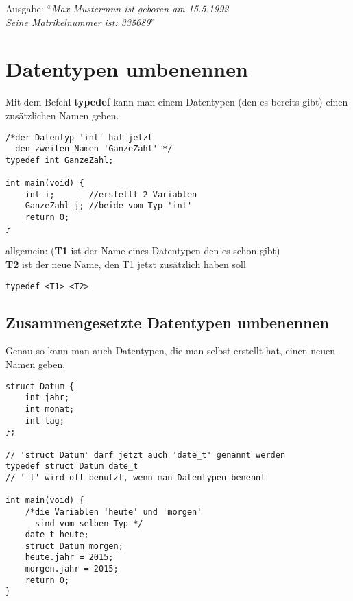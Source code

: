 \documentclass[c_worksheet.tex]{subfiles}
\begin{document}
\begin{tabbing}
Ausgabe: ``\=\textit{Max Mustermnn ist geboren am 15.5.1992}\\
           \>\textit{Seine Matrikelnummer ist: 335689}''
\end{tabbing}

\section{Datentypen umbenennen}

Mit dem Befehl \textbf{typedef} kann man einem Datentypen (den es bereits gibt) einen zusätzlichen Namen geben.

\begin{lstlisting}
/*der Datentyp 'int' hat jetzt
  den zweiten Namen 'GanzeZahl' */
typedef int GanzeZahl;

int main(void) {
    int i;       //erstellt 2 Variablen
    GanzeZahl j; //beide vom Typ 'int'
    return 0;
}
\end{lstlisting}

\begin{tabbing}
allgemein: (\=\textbf{T1} ist der Name eines Datentypen den es schon gibt)\\
            \>\textbf{T2} ist der neue Name, den T1 jetzt zusätzlich haben soll
\end{tabbing}
\begin{lstlisting}[numbers=none]
typedef <T1> <T2>
\end{lstlisting}

\subsection{Zusammengesetzte Datentypen umbenennen}

Genau so kann man auch Datentypen, die man selbst erstellt hat, einen neuen Namen geben.

\begin{lstlisting}
struct Datum {
    int jahr;
    int monat;
    int tag;
};

// 'struct Datum' darf jetzt auch 'date_t' genannt werden
typedef struct Datum date_t
// '_t' wird oft benutzt, wenn man Datentypen benennt

int main(void) {
    /*die Variablen 'heute' und 'morgen'
      sind vom selben Typ */
    date_t heute;
    struct Datum morgen;
    heute.jahr = 2015;
    morgen.jahr = 2015;
    return 0;
}
\end{lstlisting}
\end{document}
